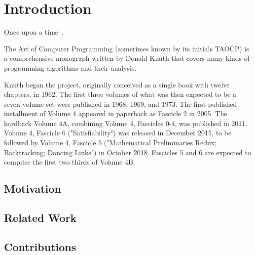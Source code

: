 \chapter{Introduction}
\minitoc
\vspace*{1cm}

Once upon a time~\cite{cfi-attack}.

The Art of Computer Programming (sometimes known by its initials TAOCP) is a
comprehensive monograph written by Donald Knuth that covers many kinds of
programming algorithms and their analysis.

Knuth began the project, originally conceived as a single book with twelve
chapters, in 1962. The first three volumes of what was then expected to be a
seven-volume set were published in 1968, 1969, and 1973. The first published
installment of Volume 4 appeared in paperback as Fascicle 2 in 2005. The
hardback Volume 4A, combining Volume 4, Fascicles 0-4, was published in 2011.
Volume 4, Fascicle 6 ("Satisfiability") was released in December 2015, to be
followed by Volume 4, Fascicle 5 ("Mathematical Preliminaries Redux;
Backtracking; Dancing Links") in October 2018. Fascicles 5 and 6 are expected
to comprise the first two thirds of Volume 4B.


\section{Motivation}

\section{Related Work}

\section{Contributions}
